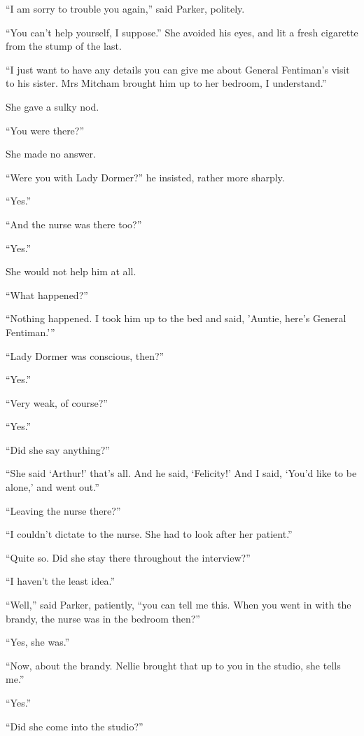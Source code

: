 \enquote{I am sorry to trouble you again,} said Parker, politely.

\enquote{You can't help yourself, I suppose.} She avoided his eyes, and lit a fresh cigarette from the stump of the last.

\enquote{I just want to have any details you can give me about General Fentiman's visit to his sister. Mrs Mitcham brought him up to her bedroom, I understand.}

She gave a sulky nod.

\enquote{You were there?}

She made no answer.

\enquote{Were you with Lady Dormer?} he insisted, rather more sharply.

\enquote{Yes.}

\enquote{And the nurse was there too?}

\enquote{Yes.}

She would not help him at all.

\enquote{What happened?}

\enquote{Nothing happened. I took him up to the bed and said, 'Auntie, here's General Fentiman.'}

\enquote{Lady Dormer was conscious, then?}

\enquote{Yes.}

\enquote{Very weak, of course?}

\enquote{Yes.}

\enquote{Did she say anything?}

\enquote{She said \enquote{Arthur!} that's all. And he said, \enquote{Felicity!} And I said, \enquote{You'd like to be alone,} and went out.}

\enquote{Leaving the nurse there?}

\enquote{I couldn't dictate to the nurse. She had to look after her patient.}

\enquote{Quite so. Did she stay there throughout the interview?}

\enquote{I haven't the least idea.}

\enquote{Well,} said Parker, patiently, \enquote{you can tell me this. When you went in with the brandy, the nurse was in the bedroom then?}

\enquote{Yes, she was.}

\enquote{Now, about the brandy. Nellie brought that up to you in the studio, she tells me.}

\enquote{Yes.}

\enquote{Did she come into the studio?}

